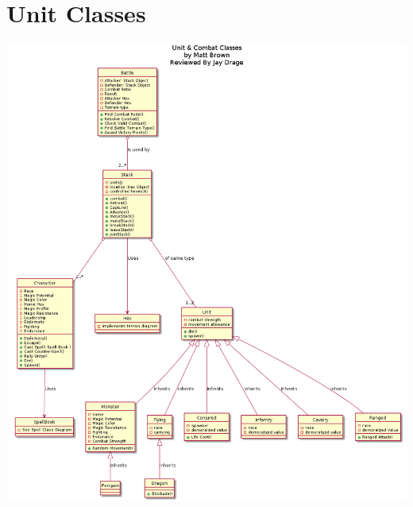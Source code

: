 \documentclass{article}
\begin{document}
\section{Unit Classes}
\includegraphics[width=\textwidth]{pngs/UnitClasses.png}


\end{document}
